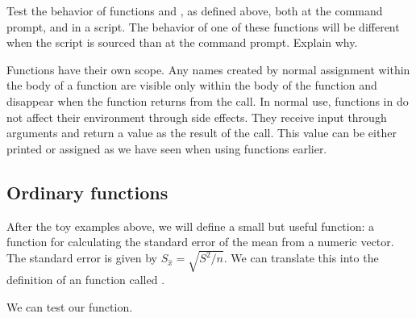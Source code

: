 \documentclass[krantz2]{krantz}\usepackage{knitr}
\begin{document}
\begin{advplayground}
Test the behavior of functions  and , as defined above, both at the command prompt, and in a script. The behavior of one of these functions will be different when the script is sourced than at the command prompt. Explain why.
\end{advplayground}

Functions have their own scope. Any names created by normal assignment within the body of a function are visible only within the body of the function and disappear when the function returns from the call. In normal use, functions in \Rlang do not affect their environment through side effects. They receive input through arguments and return a value as the result of the call. This value can be either printed or assigned as we have seen when using functions earlier.

\subsection{Ordinary functions}\label{sec:functions:sem}

After the toy examples above, we will define a small but useful function: a function for calculating the standard error of the mean from a numeric vector. The standard error is given by $S_{\hat{x}} = \sqrt{S^2 / n}$. We can translate this into the definition of an \Rlang function called .

\begin{knitrout}\footnotesize
{}\color{fgcolor}\begin{kframe}
\begin{alltt}
 \hlkwb{<-} \hlstd{(}\hlstd{)\{}\hlstd{(} \hlopt{/} 
\end{alltt}
\end{kframe}
\end{knitrout}

We can test our function.
\end{document}
